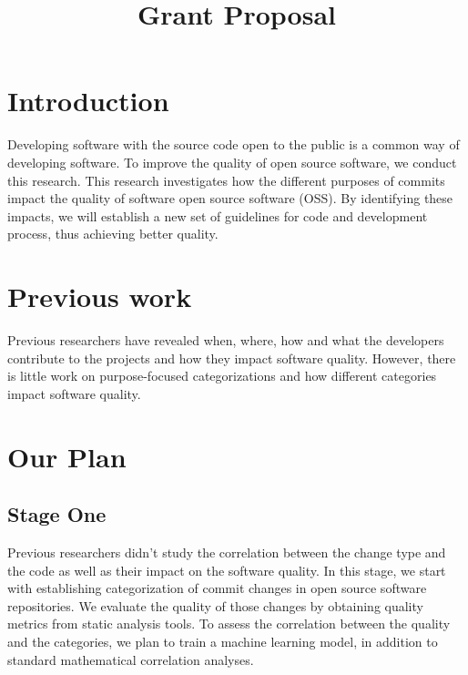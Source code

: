 \documentclass[10pt,conference]{IEEEtran}
\begin{document}
\title{Grant Proposal}

\author{
}

\maketitle


\section{Introduction}

Developing software with the source code open to the public is a common way of developing software.
To improve the quality of open source software, we conduct this research.
This research investigates how the different purposes of commits impact the quality of software open source software (OSS).
By identifying these impacts, we will establish a new set of guidelines for code and development process, thus achieving better quality.

\section{Previous work}

Previous researchers have revealed when, where, how and what the developers contribute to the projects and how they impact software quality. 
However, there is little work on purpose-focused categorizations and how different categories impact software quality.

\section{Our Plan}

\subsection{Stage One}
Previous researchers didn't study the correlation between the change type and the code as well as their impact on the software quality. 
In this stage, we start with establishing categorization of commit changes in open source software repositories.
We evaluate the quality of those changes by obtaining quality metrics from static analysis tools.
To assess the correlation between the quality and the categories, we plan to train a machine learning model, in addition to standard mathematical correlation analyses.
\end{document}
